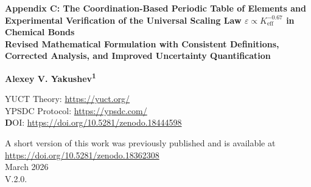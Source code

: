 \documentclass[12pt,a4paper]{article}
\theoremstyle{remark}
\newcommand{\Keff}{K_{\mathrm{eff}}}
\begin{document}
	
	\begin{titlepage}
		\begin{center}
			\vspace*{1cm}
			
			\Huge\textbf{Appendix C: The Coordination-Based Periodic Table of Elements and Experimental Verification of the Universal Scaling Law $\varepsilon \propto \Keff^{-0.67}$ in Chemical Bonds} \\
			\vspace{0.5cm}
			\Large\textbf{Revised Mathematical Formulation with Consistent Definitions, Corrected Analysis, and Improved Uncertainty Quantification}
			
			\vspace{1.5cm}
			
			\Large\textbf{Alexey V. Yakushev\textsuperscript{1}}
			
	YUCT Theory: \url{https://yuct.org/}\\
YPSDC Protocol: \url{https://ypsdc.com/}\\


\vspace{2cm}
\textbf DOI: \url{https://doi.org/10.5281/zenodo.18444598}\\

\vspace{1cm}

\vspace{0cm}
\large 
A short version of this work was previously published and is available at\\ \url{https://doi.org/10.5281/zenodo.18362308}\\
\vspace{1cm}
March 2026 \\ \large V.2.0.
			
			\vspace{2cm}
			

\end{center}
\end{titlepage}
\end{document}
